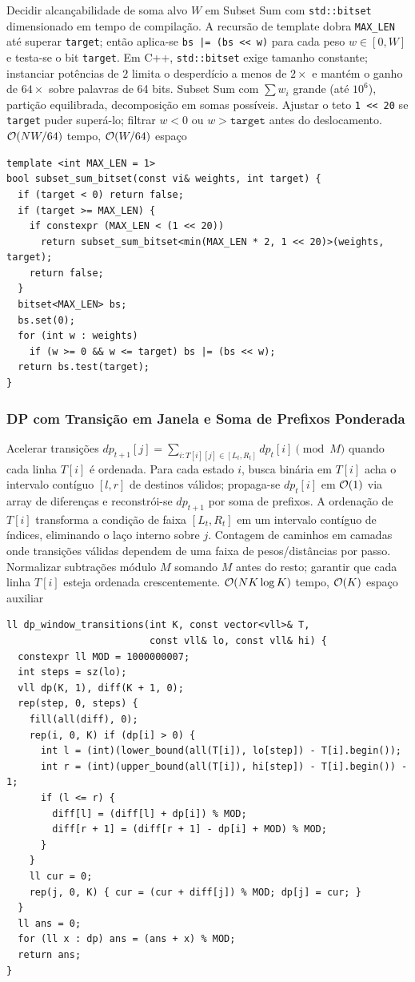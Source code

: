 \algobox
  {Decidir alcançabilidade de soma alvo $W$ em Subset Sum com \texttt{std::bitset} dimensionado em tempo de compilação.}
  {A recursão de template dobra \texttt{MAX\_LEN} até superar \texttt{target}; então aplica-se \texttt{bs |= (bs << w)} para cada peso $w \in [0, W]$ e testa-se o bit \texttt{target}.}
  {Em C++, \texttt{std::bitset} exige tamanho constante; instanciar potências de $2$ limita o desperdício a menos de $2\times$ e mantém o ganho de $64\times$ sobre palavras de 64 bits.}
  {Subset Sum com $\sum w_i$ grande (até $10^6$), partição equilibrada, decomposição em somas possíveis.}
  {Ajustar o teto \texttt{1 << 20} se \texttt{target} puder superá-lo; filtrar $w < 0$ ou $w > \texttt{target}$ antes do deslocamento.}
  {$\mathcal{O}(N W / 64)$ tempo, $\mathcal{O}(W / 64)$ espaço}

\begin{lstlisting}
template <int MAX_LEN = 1>
bool subset_sum_bitset(const vi& weights, int target) {
  if (target < 0) return false;
  if (target >= MAX_LEN) {
    if constexpr (MAX_LEN < (1 << 20))
      return subset_sum_bitset<min(MAX_LEN * 2, 1 << 20)>(weights, target);
    return false;
  }
  bitset<MAX_LEN> bs;
  bs.set(0);
  for (int w : weights)
    if (w >= 0 && w <= target) bs |= (bs << w);
  return bs.test(target);
}
\end{lstlisting}

\subsubsection{DP com Transição em Janela e Soma de Prefixos Ponderada}
\algobox
  {Acelerar transições $dp_{t+1}[j] = \sum_{i : T[i][j] \in [L_t, R_t]} dp_t[i] \pmod M$ quando cada linha $T[i]$ é ordenada.}
  {Para cada estado $i$, busca binária em $T[i]$ acha o intervalo contíguo $[l, r]$ de destinos válidos; propaga-se $dp_t[i]$ em $\mathcal{O}(1)$ via array de diferenças e reconstrói-se $dp_{t+1}$ por soma de prefixos.}
  {A ordenação de $T[i]$ transforma a condição de faixa $[L_t, R_t]$ em um intervalo contíguo de índices, eliminando o laço interno sobre $j$.}
  {Contagem de caminhos em camadas onde transições válidas dependem de uma faixa de pesos/distâncias por passo.}
  {Normalizar subtrações módulo $M$ somando $M$ antes do resto; garantir que cada linha $T[i]$ esteja ordenada crescentemente.}
  {$\mathcal{O}(N K \log K)$ tempo, $\mathcal{O}(K)$ espaço auxiliar}

\begin{lstlisting}
ll dp_window_transitions(int K, const vector<vll>& T,
                         const vll& lo, const vll& hi) {
  constexpr ll MOD = 1000000007;
  int steps = sz(lo);
  vll dp(K, 1), diff(K + 1, 0);
  rep(step, 0, steps) {
    fill(all(diff), 0);
    rep(i, 0, K) if (dp[i] > 0) {
      int l = (int)(lower_bound(all(T[i]), lo[step]) - T[i].begin());
      int r = (int)(upper_bound(all(T[i]), hi[step]) - T[i].begin()) - 1;
      if (l <= r) {
        diff[l] = (diff[l] + dp[i]) % MOD;
        diff[r + 1] = (diff[r + 1] - dp[i] + MOD) % MOD;
      }
    }
    ll cur = 0;
    rep(j, 0, K) { cur = (cur + diff[j]) % MOD; dp[j] = cur; }
  }
  ll ans = 0;
  for (ll x : dp) ans = (ans + x) % MOD;
  return ans;
}
\end{lstlisting}

